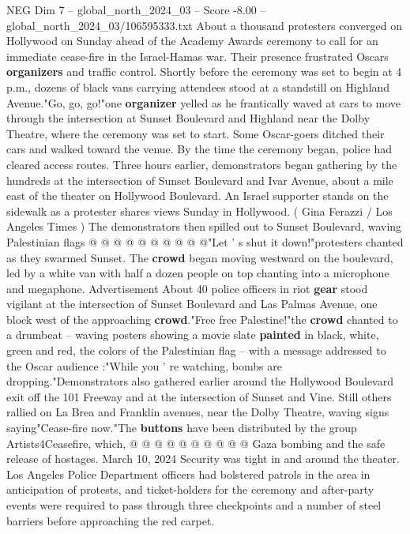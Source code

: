 \begin{textsample}{NEG Dim 7 – global\_north\_2024\_03 – Score -8.00 – global\_north\_2024\_03/106595333.txt}  \label{ex:f7_neg_233}
About a thousand protesters converged on Hollywood on Sunday ahead of the Academy Awards ceremony to call for an immediate cease-fire in the Israel-Hamas war.
Their presence frustrated Oscars \textbf{organizers} and traffic control.
Shortly before the ceremony was set to begin at 4 p.m., dozens of black vans carrying attendees stood at a standstill on Highland Avenue."Go, go, go!"one \textbf{organizer} yelled as he frantically waved at cars to move through the intersection at Sunset Boulevard and Highland near the Dolby Theatre, where the ceremony was set to start.
Some Oscar-goers ditched their cars and walked toward the venue.
By the time the ceremony began, police had cleared access routes.
Three hours earlier, demonstrators began gathering by the hundreds at the intersection of Sunset Boulevard and Ivar Avenue, about a mile east of the theater on Hollywood Boulevard.
An Israel supporter stands on the sidewalk as a protester shares views Sunday in Hollywood. ( Gina Ferazzi / Los Angeles Times ) The demonstrators then spilled out to Sunset Boulevard, waving Palestinian flags @ @ @ @ @ @ @ @ @ @"Let ' s shut it down!"protesters chanted as they swarmed Sunset.
The \textbf{crowd} began moving westward on the boulevard, led by a white van with half a dozen people on top chanting into a microphone and megaphone.
Advertisement About 40 police officers in riot \textbf{gear} stood vigilant at the intersection of Sunset Boulevard and Las Palmas Avenue, one block west of the approaching \textbf{crowd}."Free free Palestine!"the \textbf{crowd} chanted to a drumbeat -- waving posters showing a movie slate \textbf{painted} in black, white, green and red, the colors of the Palestinian flag -- with a message addressed to the Oscar audience :"While you ' re watching, bombs are dropping."Demonstrators also gathered earlier around the Hollywood Boulevard exit off the 101 Freeway and at the intersection of Sunset and Vine.
Still others rallied on La Brea and Franklin avenues, near the Dolby Theatre, waving signs saying"Cease-fire now."The \textbf{buttons} have been distributed by the group Artists4Ceasefire, which, @ @ @ @ @ @ @ @ @ @ Gaza bombing and the safe release of hostages.
March 10, 2024 Security was tight in and around the theater.
Los Angeles Police Department officers had bolstered patrols in the area in anticipation of protests, and ticket-holders for the ceremony and after-party events were required to pass through three checkpoints and a number of steel barriers before approaching the red carpet.

\end{textsample}
